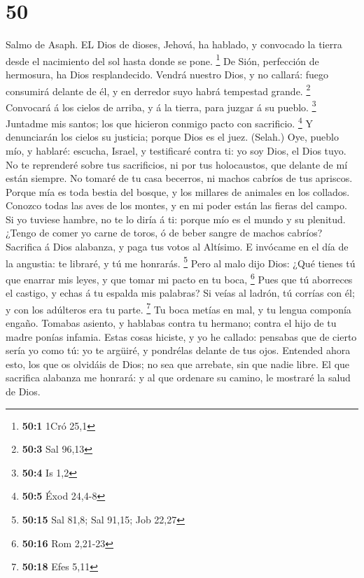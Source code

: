 \hypertarget{section-49}{%
\section{50}\label{section-49}}

 Salmo de Asaph. EL Dios de dioses, Jehová, ha hablado, y
convocado la tierra desde el nacimiento del sol hasta donde se pone.
\footnote{\textbf{50:1} 1Cró 25,1}  De Sión, perfección de
hermosura, ha Dios resplandecido.  Vendrá nuestro Dios, y no
callará: fuego consumirá delante de él, y en derredor suyo habrá
tempestad grande. \footnote{\textbf{50:3} Sal 96,13} 
Convocará á los cielos de arriba, y á la tierra, para juzgar á su
pueblo. \footnote{\textbf{50:4} Is 1,2}  Juntadme mis
santos; los que hicieron conmigo pacto con sacrificio. \footnote{\textbf{50:5}
  Éxod 24,4-8}  Y denunciarán los cielos su justicia; porque
Dios es el juez. (Selah.)  Oye, pueblo mío, y hablaré:
escucha, Israel, y testificaré contra ti: yo soy Dios, el Dios tuyo.
 No te reprenderé sobre tus sacrificios, ni por tus
holocaustos, que delante de mí están siempre.  No tomaré de
tu casa becerros, ni machos cabríos de tus apriscos. 
Porque mía es toda bestia del bosque, y los millares de animales en los
collados.  Conozco todas las aves de los montes, y en mi
poder están las fieras del campo.  Si yo tuviese hambre, no
te lo diría á ti: porque mío es el mundo y su plenitud. 
¿Tengo de comer yo carne de toros, ó de beber sangre de machos cabríos?
 Sacrifica á Dios alabanza, y paga tus votos al Altísimo.
 E invócame en el día de la angustia: te libraré, y tú me
honrarás. \footnote{\textbf{50:15} Sal 81,8; Sal 91,15; Job 22,27}
 Pero al malo dijo Dios: ¿Qué tienes tú que enarrar mis
leyes, y que tomar mi pacto en tu boca, \footnote{\textbf{50:16} Rom
  2,21-23}  Pues que tú aborreces el castigo, y echas á tu
espalda mis palabras?  Si veías al ladrón, tú corrías con
él; y con los adúlteros era tu parte. \footnote{\textbf{50:18} Efes 5,11}
 Tu boca metías en mal, y tu lengua componía engaño.
 Tomabas asiento, y hablabas contra tu hermano; contra el
hijo de tu madre ponías infamia.  Estas cosas hiciste, y yo
he callado: pensabas que de cierto sería yo como tú: yo te argüiré, y
pondrélas delante de tus ojos.  Entended ahora esto, los
que os olvidáis de Dios; no sea que arrebate, sin que nadie libre.
 El que sacrifica alabanza me honrará: y al que ordenare su
camino, le mostraré la salud de Dios.

